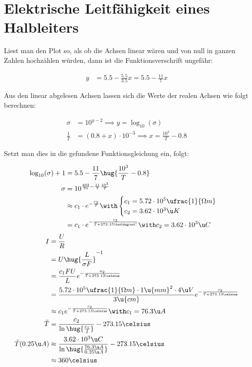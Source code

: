 \documentclass[11pt]{article}
\begin{document}
\section{Elektrische Leitfähigkeit eines Halbleiters}
\begin{adjustwidth}{20pt}{}
    Liest man den Plot so, als ob die Achsen linear wären und 
    von null in ganzen Zahlen hochzählen würden, dann ist die Funktionsverschrift
    ungefähr:
\end{adjustwidth}
\begin{align*}
    y &= 5.5 -\frac{5.5}{3.5}x  = 5.5 -\frac{11}{7}x 
\end{align*}
\begin{adjustwidth}{20pt}{}
    Aus den linear abgelesen Achsen lassen sich die Werte der 
    realen Achsen wie folgt berechnen: 
\end{adjustwidth}
\begin{align*}
    \sigma &= 10^{y-2} \implies y =\log_{10}(\sigma)\\
    \frac{1}{T} &= (0.8 + x)\cdot 10^{-3} \implies x = \frac {10^3}{T} - 0.8
\end{align*}
\begin{adjustwidth}{20pt}{}
    Setzt man dies in die gefundene Funktionsgleichung ein, folgt:
\end{adjustwidth}
\begin{align*}
    \log_{10}(\sigma)+1 &= 5.5 -\frac{11}{7}\hug{\frac {10^3}{T} - 0.8}\\
    \sigma &= 10^{\frac{403}{70} -\frac{11}{7}\frac {10^3}{T}} \\
    &\approx c_1 \cdot e^{-\frac{c_2}{T}} \with \begin{cases}
        c_1 = 5.72\cdot 10^{5}\ufrac{1}{\Omega m} \\
        c_2 = 3.62\cdot 10^{3}\u K\\
    \end{cases}\\
    &= c_1 \cdot e^{-\frac{c_2}{\tilde T + 273.15° \mathrm C}}\with c_2 = 3.62\cdot 10^{3}\u C
\end{align*}
\begin{align*}
    I &= \frac{U}{R}\\
    &= U \hug{\frac{L}{\sigma F}}^{-1}\\
    &= \frac{c_1 F U}{L} e^{-\frac{a_2}{\tilde T + 273.13\celsius}}\\
    &= \frac{5.72\cdot 10^{5}\ufrac{1}{\Omega m} \cdot 1\u{mm}^2\cdot 4 \u V}{3\u{cm}}e^{-\frac{c_2}{\tilde T + 273.13\celsius}}\\
    &\approx c_1 e^{-\frac{c_2}{\tilde T + 273.13\celsius}} \with c_1 = 76.3\u A\\
    \tilde T &= \frac{c_2}{\ln\hug{\frac{c_1}{I}}} - 273.15\celsius\\ 
    \tilde T(0.25\u A) &\approx \frac{3.62\cdot 10^{3}\u C}{\ln\hug{\frac{76.3\u A}{0.25\u A}}} -273.15\celsius\\ 
    &\approx 360\celsius
\end{align*}
\end{document}

